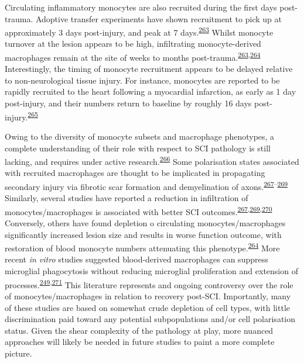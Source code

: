 \documentclass[
]{article}
\begin{document}
Circulating inflammatory monocytes are also recruited during the first days post-trauma.
Adoptive transfer experiments have shown recruitment to pick up at approximately 3 days post-injury, and peak at 7 days.\textsuperscript{\protect\hyperlink{ref-blomster_mobilisation_2013}{263}}
Whilst monocyte turnover at the lesion appears to be high, infiltrating monocyte-derived macrophages remain at the site of weeks to months post-trauma.\textsuperscript{\protect\hyperlink{ref-blomster_mobilisation_2013}{263},\protect\hyperlink{ref-shechter_infiltrating_2009}{264}}
Interestingly, the timing of monocyte recruitment appears to be delayed relative to non-neurological tissue injury.
For instance, monocytes are reported to be rapidly recruited to the heart following a myocardial infarction, as early as 1 day post-injury, and their numbers return to baseline by roughly 16 days post-injury.\textsuperscript{\protect\hyperlink{ref-nahrendorf_healing_2007}{265}}

Owing to the diversity of monocyte subsets and macrophage phenotypes, a complete understanding of their role with respect to SCI pathology is still lacking, and requires under active research.\textsuperscript{\protect\hyperlink{ref-david_repertoire_2011}{266}}
Some polarisation states associated with recruited macrophages are thought to be implicated in propagating secondary injury via fibrotic scar formation and demyelination of axons.\textsuperscript{\protect\hyperlink{ref-kigerl_identification_2009}{267}--\protect\hyperlink{ref-zhu_hematogenous_2015}{269}}
Similarly, several studies have reported a reduction in infiltration of monocytes/macrophages is associated with better SCI outcomes.\textsuperscript{\protect\hyperlink{ref-kigerl_identification_2009}{267},\protect\hyperlink{ref-zhu_hematogenous_2015}{269},\protect\hyperlink{ref-horn_another_2008}{270}}
Conversely, others have found depletion o circulating monocytes/macrophages significantly increased lesion size and results in worse function outcome, with restoration of blood monocyte numbers attenuating this phenotype.\textsuperscript{\protect\hyperlink{ref-shechter_infiltrating_2009}{264}}
More recent \emph{in vitro} studies suggested blood-derived macrophages can suppress microglial phagocytosis without reducing microglial proliferation and extension of processes.\textsuperscript{\protect\hyperlink{ref-greenhalgh_differences_2014}{249},\protect\hyperlink{ref-greenhalgh_peripherally_2018}{271}}
This literature represents and ongoing controversy over the role of monocytes/macrophages in relation to recovery post-SCI.
Importantly, many of these studies are based on somewhat crude depletion of cell types, with little discrimination paid toward any potential subpopulations and/or cell polarisation status.
Given the shear complexity of the pathology at play, more nuanced approaches will likely be needed in future studies to paint a more complete picture.
\end{document}
